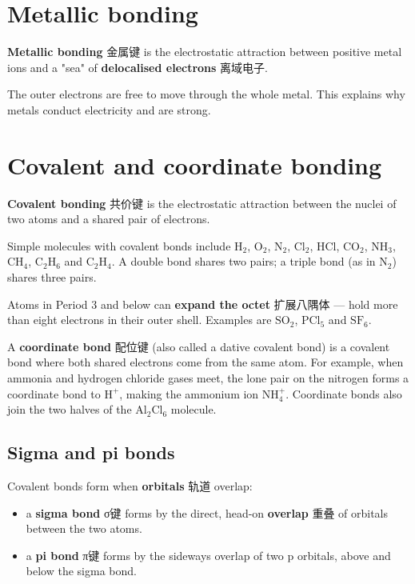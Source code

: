 \documentclass[11pt]{article}
\begin{document}
\section*{Metallic bonding}

\textbf{Metallic bonding} 金属键 is the electrostatic attraction between positive metal ions and a "sea" of \textbf{delocalised electrons} 离域电子.

The outer electrons are free to move through the whole metal. This explains why metals conduct electricity and are strong.

\section*{Covalent and coordinate bonding}

\textbf{Covalent bonding} 共价键 is the electrostatic attraction between the nuclei of two atoms and a shared pair of electrons.

Simple molecules with covalent bonds include $\text{H}_2$, $\text{O}_2$, $\text{N}_2$, $\text{Cl}_2$, $\text{HCl}$, $\text{CO}_2$, $\text{NH}_3$, $\text{CH}_4$, $\text{C}_2\text{H}_6$ and $\text{C}_2\text{H}_4$. A double bond shares two pairs; a triple bond (as in $\text{N}_2$) shares three pairs.

Atoms in Period 3 and below can \textbf{expand the octet} 扩展八隅体 — hold more than eight electrons in their outer shell. Examples are $\text{SO}_2$, $\text{PCl}_5$ and $\text{SF}_6$.

A \textbf{coordinate bond} 配位键 (also called a dative covalent bond) is a covalent bond where both shared electrons come from the same atom. For example, when ammonia and hydrogen chloride gases meet, the lone pair on the nitrogen forms a coordinate bond to $\text{H}^+$, making the ammonium ion $\text{NH}_4^+$. Coordinate bonds also join the two halves of the $\text{Al}_2\text{Cl}_6$ molecule.

\subsection*{Sigma and pi bonds}

Covalent bonds form when \textbf{orbitals} 轨道 overlap:

\begin{itemize}
\item a \textbf{sigma bond} σ键 forms by the direct, head-on \textbf{overlap} 重叠 of orbitals between the two atoms.

\item a \textbf{pi bond} π键 forms by the sideways overlap of two p orbitals, above and below the sigma bond.

\end{itemize}
\end{document}
